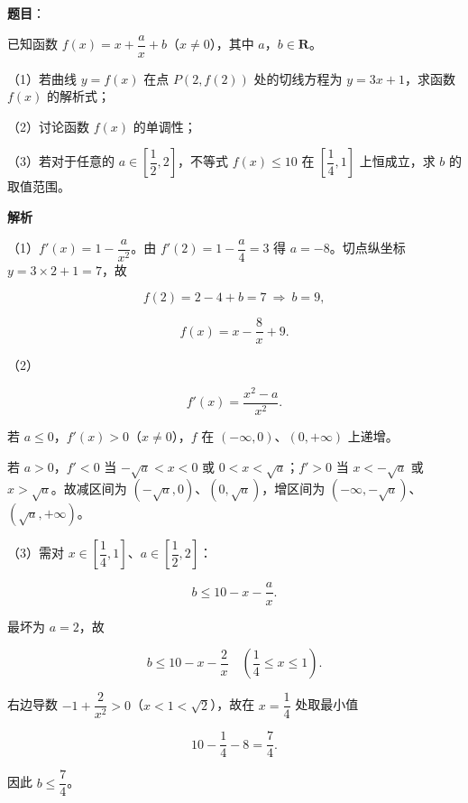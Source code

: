 \begin{answer}

\textbf{题目}：

已知函数 $f(x)=x+\dfrac ax+b$（$x\neq0$），其中 $a$，$b\in\mathbf R$。

（1）若曲线 $y=f(x)$ 在点 $P(2,f(2))$ 处的切线方程为 $y=3x+1$，求函数 $f(x)$ 的解析式；

（2）讨论函数 $f(x)$ 的单调性；

（3）若对于任意的 $a\in\left[\dfrac12,2\right]$，不等式 $f(x)\leqslant10$ 在 $\left[\dfrac14,1\right]$ 上恒成立，求 $b$ 的取值范围。

\textbf{解析}

（1）$f'(x)=1-\dfrac a{x^2}$。由 $f'(2)=1-\dfrac a4=3$ 得 $a=-8$。切点纵坐标 $y=3\times2+1=7$，故

\nopagebreak[4]
\[f(2)=2-4+b=7\ \Longrightarrow\ b=9,\]

\nopagebreak[4]
\[f(x)=x-\frac8x+9.\]

（2）

\nopagebreak[4]
\[f'(x)=\frac{x^2-a}{x^2}.\]

若 $a\leqslant0$，$f'(x)>0$（$x\neq0$），$f$ 在 $(-\infty,0)$、$(0,+\infty)$ 上递增。

若 $a>0$，$f'<0$ 当 $-\sqrt a<x<0$ 或 $0<x<\sqrt a$；$f'>0$ 当 $x<-\sqrt a$ 或 $x>\sqrt a$。故减区间为 $(-\sqrt a,0)$、$(0,\sqrt a)$，增区间为 $(-\infty,-\sqrt a)$、$(\sqrt a,+\infty)$。

（3）需对 $x\in\left[\dfrac14,1\right]$、$a\in\left[\dfrac12,2\right]$：

\nopagebreak[4]
\[b\leqslant10-x-\frac ax.\]

最坏为 $a=2$，故

\nopagebreak[4]
\[b\leqslant10-x-\frac2x\quad\left(\frac14\leqslant x\leqslant1\right).\]

右边导数 $-1+\dfrac2{x^2}>0$（$x<1<\sqrt2$），故在 $x=\dfrac14$ 处取最小值

\nopagebreak[4]
\[10-\frac14-8=\frac74.\]

因此 $b\leqslant\dfrac74$。


\end{answer}
